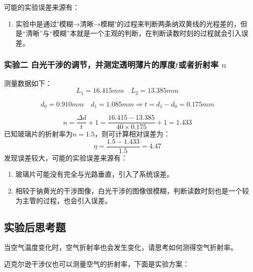 \documentclass[dvipsnames, svgnames,a4paper,11pt]{article}
\begin{document}
		可能的实验误差来源有：
		\begin{enumerate}
			\item 实验中是通过"模糊→清晰→模糊"的过程来判断两条纳双黄线的光程差的，但是“清晰”与“模糊”本就是一个主观的判断，在判断读数时刻的过程就会引入误差。
			
		\end{enumerate}
		
	\subsubsection{实验二 白光干涉的调节，并测定透明薄片的厚度$t$或者折射率 $n$}
		测量数据如下：
		\[ 
		L_1=16.415mm \quad L_2=13.385mm
		\]

		\[ 
		d_0=0.910mm \quad d_1=1.085mm\Longrightarrow t=d_1-d_0=0.175mm
		\]

		\[ 
		n=\frac{\Delta d}{t}+1=\frac{16.415-13.385}{40\times0.175}+1=1.433
		\]
		已知玻璃片的折射率为$n=1.5$，则可计算相对误差为：
		\[
		\eta=\frac{1.5-1.433}{1.5}=4.47%
		\]
		发现误差较大，可能的实验误差来源有：
		\begin{enumerate}
			\item 玻璃片可能没有完全与光路垂直，引入了系统误差。
			\item 相较于钠黄光的干涉图像，白光干涉的图像很模糊，判断读数时刻也是一个较为主管的过程，也会引入误差。
		\end{enumerate}
			
			
\subsection{实验后思考题}



\begin{question}
	当空气温度变化时，空气折射率也会发生变化，请思考如何测得空气折射率。
\end{question}
	
	迈克尔逊干涉仪也可以测量空气的折射率，下面是实验方案：
	
\end{document}
